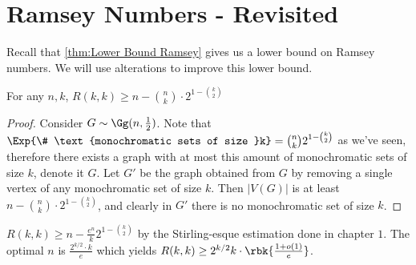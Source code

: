 \documentclass[a4paper, 11pt, oneside]{book}
\begin{document}
\section{Ramsey Numbers - Revisited}
Recall that \ref{thm:Lower Bound Ramsey} gives us a lower bound on Ramsey numbers. We will use alterations to improve this lower bound.
\begin{thm}
	\label{thm: Ramsey Lower bound Improved}For any $n,k$, $R(k,k)\ge n-{n\choose k}\cdot 2^{1-{k\choose 2}}$
\end{thm}
\begin{proof}
	Consider $G\sim \Gg(n,\frac{1}{2})$. Note that $\Exp{\# \text{monochromatic sets of size }k}= {n\choose k}2^{1-{k\choose 2}}$ as we've seen, therefore there exists a graph with at most this amount of monochromatic sets of size $k$, denote it $G$. Let $G'$ be the graph obtained from $G$ by removing a single vertex of any monochromatic set of size $k$. Then $|V(G)|$ is at least $n-{n\choose k}\cdot 2^{1-{k\choose 2}}$, and clearly in $G'$ there is no monochromatic set of size $k$.
\end{proof}
\begin{cor}
$R(k,k) \ge n-\frac{e^n}{k}2^{1-{k\choose 2}}$ by the Stirling-esque estimation done in chapter $1$. The optimal $n$ is 	$\frac{2^{k/2}\cdot k}{e}$ which yields $R(k,k)\ge 2^{k/2}k\cdot\rbk{\frac{1+o(1)}{e}}$.
\end{cor}
\end{document}
